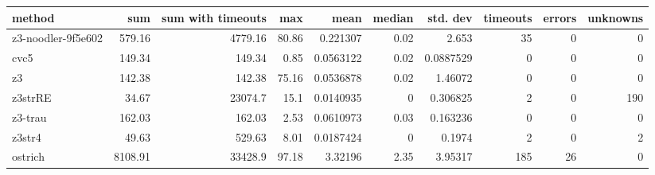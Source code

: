 \begin{tabular}{lrrrrrrrrr}
\hline
 method             &     sum &   sum with timeouts &   max &      mean &   median &   std. dev &   timeouts &   errors &   unknowns \\
\hline
 z3-noodler-9f5e602 &  579.16 &             4779.16 & 80.86 & 0.221307  &     0.02 &  2.653     &         35 &        0 &          0 \\
 cvc5               &  149.34 &              149.34 &  0.85 & 0.0563122 &     0.02 &  0.0887529 &          0 &        0 &          0 \\
 z3                 &  142.38 &              142.38 & 75.16 & 0.0536878 &     0.02 &  1.46072   &          0 &        0 &          0 \\
 z3strRE            &   34.67 &            23074.7  & 15.1  & 0.0140935 &     0    &  0.306825  &          2 &        0 &        190 \\
 z3-trau            &  162.03 &              162.03 &  2.53 & 0.0610973 &     0.03 &  0.163236  &          0 &        0 &          0 \\
 z3str4             &   49.63 &              529.63 &  8.01 & 0.0187424 &     0    &  0.1974    &          2 &        0 &          2 \\
 ostrich            & 8108.91 &            33428.9  & 97.18 & 3.32196   &     2.35 &  3.95317   &        185 &       26 &          0 \\
\hline
\end{tabular}

